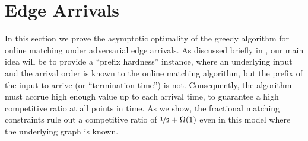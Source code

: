 \section{Edge Arrivals}\label{sec:edge}

In this section we prove the asymptotic optimality of the greedy algorithm for online matching under adversarial edge arrivals.
As discussed briefly in , our main idea will be to provide a ``prefix hardness'' instance, where an underlying input and the arrival order is known to the online matching algorithm, but the prefix of the input to arrive (or ``termination time'') is not. Consequently, the algorithm must accrue high enough value up to each arrival time, to guarantee a high competitive ratio at all points in time. As we show, the fractional matching constraints rule out a competitive ratio of $\nicefrac{1}{2}+\Omega(1)$ even in this model where the underlying graph is known.

